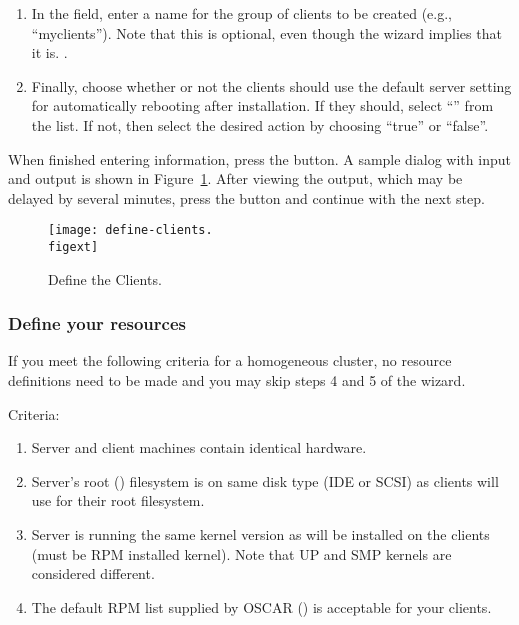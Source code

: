\begin{enumerate}
\item In the  field, enter a name for the group
  of clients to be created (e.g., ``myclients''). Note that this is
   optional, even though the wizard implies that it is.
  .
    
\item Finally, choose whether or not the clients should use the
  default server setting for automatically rebooting after
  installation. If they should, select ``'' from the
   list. If not, then select the desired
  action by choosing ``true'' or ``false''.
\end{enumerate}
  
When finished entering information, press the  button.
A sample dialog with input and output is shown in
Figure~\ref{fig:detailed-define-clients}. After viewing the output,
which may be delayed by several minutes, press the 
button and continue with the next step.

\begin{figure}[htbp]
  \begin{center}
    \texttt{[image: define-clients.\\figext]}
    \caption{Define the Clients.}
    \label{fig:detailed-define-clients}
  \end{center}
\end{figure}
    
\subsubsection{Define your resources} 

If you meet the following criteria for a homogeneous cluster, no
resource definitions need to be made and you may skip steps 4 and 5 of
the wizard.

Criteria:

\begin{enumerate}
\item Server and client machines contain identical hardware.
  
\item Server's root (\file{/}) filesystem is on same disk type (IDE
  or SCSI) as clients will use for their root filesystem.
    
\item Server is running the same kernel version as will be installed
  on the clients (must be RPM installed kernel). Note that UP and
  SMP kernels are considered different.
  
\item The default RPM list supplied by OSCAR
  () is
  acceptable for your clients.
\end{enumerate}

